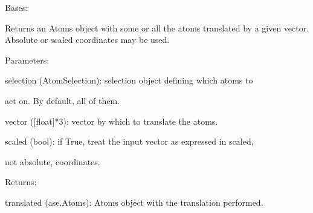 \documentclass[letterpaper,10pt,english]{sphinxmanual}
\begin{document}

\begin{fulllineitems}
\label{doctree/soprano.properties.transform.transform:soprano.properties.transform.transform.Translate}
Bases: {\hyperref[doctree/soprano.properties.atomsproperty:soprano.properties.atomsproperty.AtomsProperty]{}}

Returns an Atoms object with some or all the atoms translated by a given
vector. Absolute or scaled coordinates may be used.

\begin{DUlineblock}{0em}
\item[] Parameters:
\item[]
\begin{DUlineblock}{\DUlineblockindent}
\item[] selection (AtomSelection): selection object defining which atoms to
\item[]
\begin{DUlineblock}{\DUlineblockindent}
\item[] act on. By default, all of them.
\end{DUlineblock}
\item[] vector ({[}float{]}*3): vector by which to translate the atoms.
\item[] scaled (bool): if True, treat the input vector as expressed in scaled,
\item[]
\begin{DUlineblock}{\DUlineblockindent}
\item[] not absolute, coordinates.
\end{DUlineblock}
\end{DUlineblock}
\end{DUlineblock}

\begin{DUlineblock}{0em}
\item[] Returns:
\item[]
\begin{DUlineblock}{\DUlineblockindent}
\item[] translated (ase.Atoms): Atoms object with the translation performed.
\end{DUlineblock}
\end{DUlineblock}


\end{fulllineitems}
\end{document}
